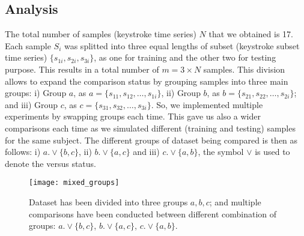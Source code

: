\documentclass[runningheads,a4paper]{llncs}
\begin{document}
\subsection{Analysis} \label{subsec:results}
The total number of samples (keystroke time series) $N$ that we obtained is 17. Each sample $S_i$ was splitted into three equal lengths of subset (keystroke subset time series) $\{s_{1i},s_{2i},s_{3i}\}$, as one for training and the other two for testing purpose. This results in a total number of $m=3\times N$ samples. This division allows to expand the comparison status by grouping samples into three main groups: i) Group $a$, as $a = \{s_{11},s_{12},\dots,s_{1i}\}$, ii) Group $b$, as $b = \{s_{21},s_{22},\dots,s_{2i}\}$; and iii) Group $c$, as $c = \{s_{31},s_{32},\dots,s_{3i}\}$. So, we implemented multiple experiments by swapping groups each time. This gave us also a wider comparisons each time as we simulated different (training and testing) samples for the same subject. The different groups of dataset being compared is then as follows: i) $a.\vee\{b,c\}$, ii) $b.\vee\{a,c\}$ and iii) $c.\vee\{a,b\}$, the symbol $\vee$ is used to denote the versus status.
\begin{wrapfigure}{r}{1.5in}
\caption{Dataset has been divided into three groups $a,b,c$; and multiple comparisons have been conducted between different combination of groups: $a.\vee\{b,c\}$, $b.\vee\{a,c\}$, $c.\vee\{a,b\}$.}\label{fig:smapling_groups}
\texttt{[image: mixed\_groups]}
\end{wrapfigure} 
\end{document}
